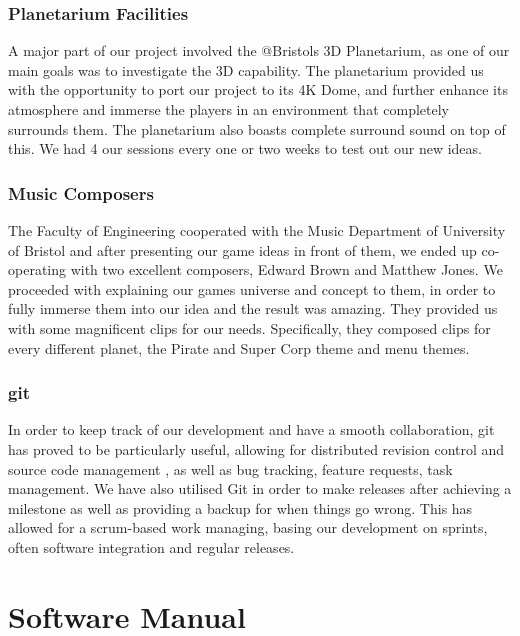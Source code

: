 \documentclass[11pt,a4paper]{article}
\begin{document}
 \subsubsection{  Planetarium Facilities}
 A major part of our project involved the @Bristols 3D Planetarium, as one of our main goals was to investigate the 3D capability. The planetarium provided us with the opportunity to port our project to its 4K Dome, and further enhance its atmosphere and immerse the players in an environment that completely surrounds them. The planetarium also boasts complete surround sound on top of this. We had 4 our sessions every one or two weeks to test out our new ideas.

 \subsubsection{ Music Composers}
 The Faculty of Engineering cooperated with the Music Department of University of Bristol and after presenting our game ideas in front of them, we ended up co-operating with two excellent composers, Edward Brown and Matthew Jones. We proceeded with explaining our games universe and concept to them, in order to fully immerse them into our idea and the result was amazing. They provided us with some magnificent clips for our needs. Specifically, they composed clips for every different planet, the Pirate and Super Corp theme and  menu themes.


 \subsubsection{git}
 In order to keep track of our development and have a smooth collaboration, git has proved to be particularly useful, allowing for distributed revision control and source code management , as well as bug tracking, feature requests, task management. We have also utilised Git in order to make releases after achieving a milestone as well as providing a backup for when things go wrong. This has allowed for a scrum-based work managing, basing our development on sprints, often software integration and regular releases.

\pagebreak

 \section{Software Manual}
\end{document}
